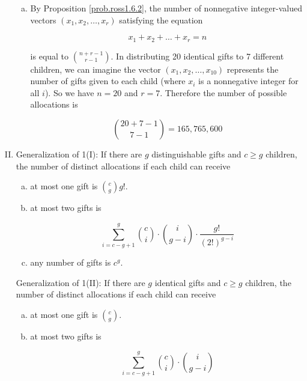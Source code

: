 \begin{enumerate}[(I)]
\begin{enumerate}[(a)]
\item By Proposition \ref{prob.ross1.6.2}, the number of nonnegative integer-valued vectors \((x_1, x_2, \ldots, x_r)\) satisfying the equation

\[
x_1 + x_2 + \ldots + x_r = n
\]

is equal to \(\binom{n + r - 1}{r - 1}\). In distributing 20 identical gifts to 7 different children, we can imagine the vector \((x_1, x_2, \ldots, x_{10})\) represents the number of gifts given to each child (where \(x_i\) is a nonnegative integer for all \(i\)). So we have \(n = 20\) and \(r = 7\). Therefore the number of possible allocations is 

\[
\binom{20 + 7 - 1}{7 - 1} = \boxed{165,765,600}
\]

\end{enumerate}

\item Generalization of 1(I): If there are \(g\) distinguishable gifts and \(c \geq g\) children, the number of distinct allocations if each child can receive

\begin{enumerate}[(a)]

\item at most one gift is \( \binom{c}{g}g!\).

\item at most two gifts is 

\[ 
\sum_{i=c - g + 1}^{g}  \binom{c}{i} \cdot \binom{i}{g - i} \cdot \frac{g!}{(2!)^{g - i}}
\]


\item any number of gifts is \(c^g\).

\end{enumerate}

Generalization of 1(II): If there are \(g\) identical gifts and \(c \geq g\) children, the number of distinct allocations if each child can receive

\begin{enumerate}[(a)]

\item at most one gift is \(\binom{c}{g}\).

\item at most two gifts is 

\[ 
\sum_{i=c - g + 1}^{g}  \binom{c}{i} \cdot \binom{i}{g - i} 
\]


\end{enumerate}
\end{enumerate}
